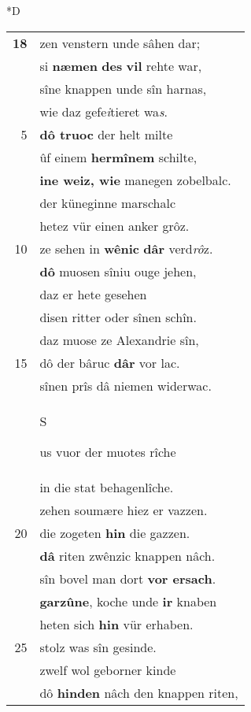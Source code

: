\documentclass[8pt,a4paper,notitlepage]{article}
\begin{document}
\begin{table}[ht]
\begin{minipage}[t]{0.5\linewidth}
\small
\begin{center}*D
\end{center}
\begin{tabular}{rl}
\textbf{18} & zen venstern unde sâhen dar;\\ 
 & si \textbf{næmen} \textbf{des} \textbf{vil} rehte war,\\ 
 & sîne knappen unde sîn harnas,\\ 
 & wie daz gefe\textit{i}tieret wa\textit{s}.\\ 
5 & \textbf{dô truoc} der helt milte\\ 
 & ûf einem \textbf{hermînem} schilte,\\ 
 & \textbf{ine weiz, wie} manegen zobelbalc.\\ 
 & der küneginne marschalc\\ 
 & hetez vür einen anker grôz.\\ 
10 & ze sehen in \textbf{wênic} \textbf{dâr} verd\textit{rô}z.\\ 
 & \textbf{dô} muosen sîniu ouge jehen,\\ 
 & daz er hete gesehen\\ 
 & disen ritter oder sînen schîn.\\ 
 & daz muose ze Alexandrie sîn,\\ 
15 & dô der bâruc \textbf{dâr} vor lac.\\ 
 & sînen prîs dâ niemen widerwac.\\ 
 & \begin{large}S\end{large}us vuor der muotes rîche\\ 
 & in die stat behagenlîche.\\ 
 & zehen soumære hiez er vazzen.\\ 
20 & die zogeten \textbf{hin} die gazzen.\\ 
 & \textbf{dâ} riten zwênzic knappen nâch.\\ 
 & sîn bovel man dort \textbf{vor ersach}.\\ 
 & \textbf{garzûne}, koche unde \textbf{ir} knaben\\ 
 & heten sich \textbf{hin} vür erhaben.\\ 
25 & stolz was sîn gesinde.\\ 
 & zwelf wol geborner kinde\\ 
 & dô \textbf{hinden} nâch den knappen riten,\\ 

\end{tabular}
\end{minipage}
\end{table}
\end{document}
